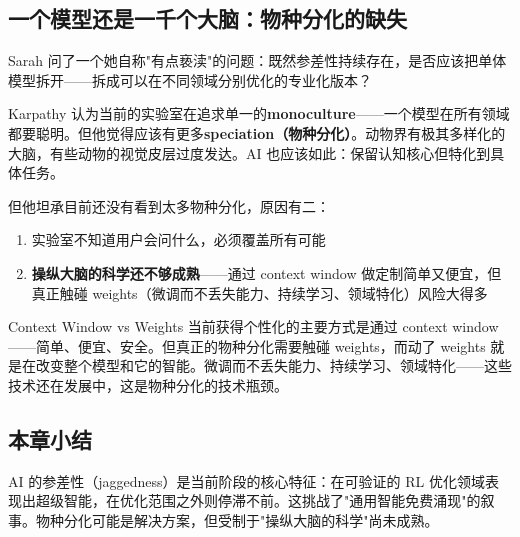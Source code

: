 \subsection{一个模型还是一千个大脑：物种分化的缺失}

Sarah 问了一个她自称"有点亵渎"的问题：既然参差性持续存在，是否应该把单体模型拆开——拆成可以在不同领域分别优化的专业化版本？

Karpathy 认为当前的实验室在追求单一的\textbf{monoculture}——一个模型在所有领域都要聪明。但他觉得应该有更多\textbf{speciation（物种分化）}。动物界有极其多样化的大脑，有些动物的视觉皮层过度发达。AI 也应该如此：保留认知核心但特化到具体任务。

但他坦承目前还没有看到太多物种分化，原因有二：
\begin{enumerate}
    \item 实验室不知道用户会问什么，必须覆盖所有可能
    \item \textbf{操纵大脑的科学还不够成熟}——通过 context window 做定制简单又便宜，但真正触碰 weights（微调而不丢失能力、持续学习、领域特化）风险大得多
\end{enumerate}

\begin{importantbox}{Context Window vs Weights}
当前获得个性化的主要方式是通过 context window——简单、便宜、安全。但真正的物种分化需要触碰 weights，而动了 weights 就是在改变整个模型和它的智能。微调而不丢失能力、持续学习、领域特化——这些技术还在发展中，这是物种分化的技术瓶颈。
\end{importantbox}

\subsection{本章小结}

AI 的参差性（jaggedness）是当前阶段的核心特征：在可验证的 RL 优化领域表现出超级智能，在优化范围之外则停滞不前。这挑战了"通用智能免费涌现"的叙事。物种分化可能是解决方案，但受制于"操纵大脑的科学"尚未成熟。


